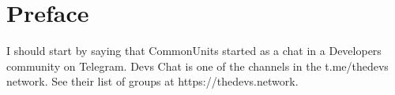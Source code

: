 \chapter*{Preface}
I should start by saying that CommonUnits started as a chat in a Developers community on Telegram. Devs Chat is one of the channels in the t.me/thedevs network. See their list of groups at https://thedevs.network.
